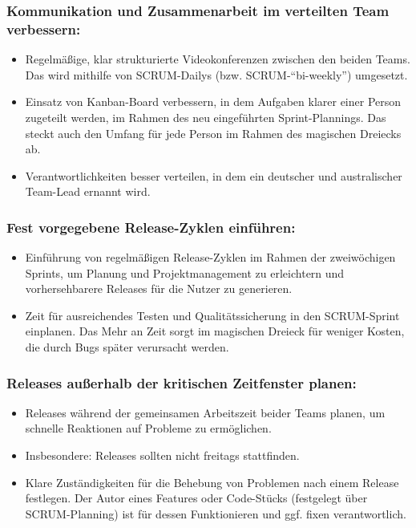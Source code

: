 \subsubsection*{Kommunikation und Zusammenarbeit im verteilten Team verbessern:}

\begin{itemize}
\item Regelmäßige, klar strukturierte Videokonferenzen zwischen den beiden Teams. 
Das wird mithilfe von SCRUM-Dailys (bzw. SCRUM-\enquote{bi-weekly}) umgesetzt.
\item Einsatz von Kanban-Board verbessern, in dem Aufgaben klarer einer Person zugeteilt werden, 
im Rahmen des neu eingeführten Sprint-Plannings. Das steckt auch den Umfang für jede Person im Rahmen des magischen Dreiecks ab.
\item Verantwortlichkeiten besser verteilen, in dem ein deutscher und australischer Team-Lead ernannt wird.
\end{itemize}

\subsubsection*{Fest vorgegebene Release-Zyklen einführen:}

\begin{itemize}
	\item Einführung von regelmäßigen Release-Zyklen im Rahmen der zweiwöchigen Sprints, 
	um Planung und Projektmanagement zu erleichtern und vorhersehbarere Releases für die Nutzer zu generieren.
	\item Zeit für ausreichendes Testen und Qualitätssicherung in den SCRUM-Sprint einplanen.
	Das Mehr an Zeit sorgt im magischen Dreieck für weniger Kosten, die durch Bugs später verursacht werden. 
\end{itemize}

\subsubsection*{Releases außerhalb der kritischen Zeitfenster planen:}

\begin{itemize}
	\item Releases während der gemeinsamen Arbeitszeit beider Teams planen, um schnelle Reaktionen auf Probleme zu ermöglichen.
	\item Insbesondere: Releases sollten nicht freitags stattfinden.
	\item Klare Zuständigkeiten für die Behebung von Problemen nach einem Release festlegen. 
	Der Autor eines Features oder Code-Stücks (festgelegt über SCRUM-Planning) ist für dessen Funktionieren und ggf. fixen verantwortlich. 
\end{itemize}

